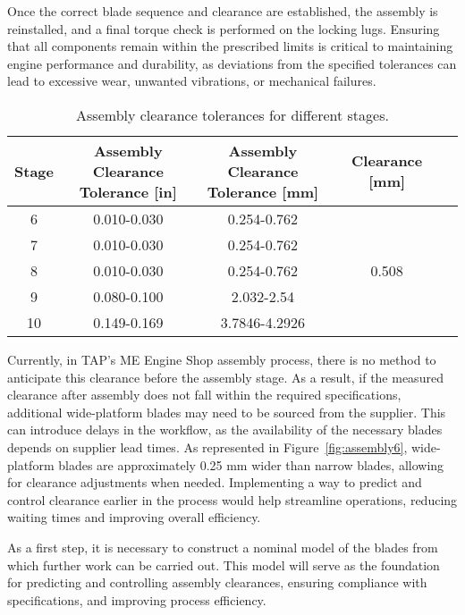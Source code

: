 Once the correct blade sequence and clearance are established, the assembly is reinstalled, and a final torque check is performed on the locking lugs. Ensuring that all components remain within the prescribed limits is critical to maintaining engine performance and durability, as deviations from the specified tolerances can lead to excessive wear, unwanted vibrations, or mechanical failures.

\begin{table}[h]
    \centering
    \begin{tabular}{ccccc}
        \toprule
        Stage & \makecell{Assembly Clearance \\ Tolerance [in]} & \makecell{Assembly Clearance \\ Tolerance [mm]} & Clearance [mm]\\
        \midrule
        6  & 0.010-0.030 & 0.254-0.762  &  \\
        7  & 0.010-0.030 & 0.254-0.762  &  \\
        8  & 0.010-0.030 & 0.254-0.762  & 0.508 \\
        9  & 0.080-0.100 & 2.032-2.54   &   \\
        10 & 0.149-0.169 & 3.7846-4.2926 &  \\
        \midrule
    \end{tabular}
    \caption{Assembly clearance tolerances for different stages.}
    \label{tab:clearance_tolerance}
\end{table}

Currently, in \gls{TAP}'s \gls{ME} Engine Shop assembly process, there is no method to anticipate this clearance before the assembly stage. As a result, if the measured clearance after assembly does not fall within the required specifications, additional wide-platform blades may need to be sourced from the supplier. This can introduce delays in the workflow, as the availability of the necessary blades depends on supplier lead times. As represented in Figure~\ref{fig:assembly6}, wide-platform blades are approximately 0.25 mm wider than narrow blades, allowing for clearance adjustments when needed. Implementing a way to predict and control clearance earlier in the process would help streamline operations, reducing waiting times and improving overall efficiency.

As a first step, it is necessary to construct a nominal model of the blades from which further work can be carried out. This model will serve as the foundation for predicting and controlling assembly clearances, ensuring compliance with specifications, and improving process efficiency.

